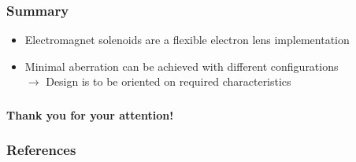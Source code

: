 \documentclass[10pt]{beamer}
\newcommand{\rarrow}{$\rightarrow$ }
\newcommand{\rfn}{\setcounter{footnote}{0}}
\begin{document}
\begin{frame}
  \frametitle{Summary}
  \rfn
  \begin{itemize}
    \item Electromagnet solenoids are a flexible electron lens implementation
    \vspace{1cm}
    \item Minimal aberration can be achieved with different configurations\\
      \rarrow Design is to be oriented on required characteristics
  \end{itemize}

\end{frame}

\begin{frame}
  \frametitle{}
  \textbf{Thank you for your attention!}
\end{frame}

\begin{frame}[allowframebreaks]
  \frametitle{References}
  \printbibliography
\end{frame}
\end{document}
